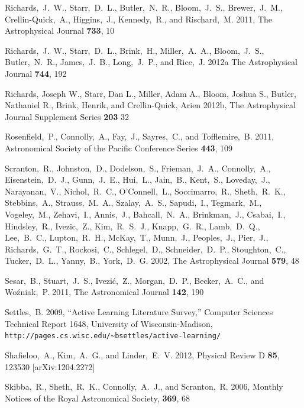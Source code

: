\documentclass[useAMS,usenatbib,tightenlines,11pt,preprint]{aastex}
\begin{document}
\begin{thebibliography}{99}
Richards,~J.~W., Starr,~D.~L., Butler,~N.~R., Bloom,~J.~S., Brewer,~J.~M.,
Crellin-Quick,~A., Higgins,~J., Kennedy,~R., and Rischard,~M. 2011,
The Astrophysical Journal {\bf 733}, 10

Richards,~J.~W., Starr,~D.~L., Brink,~H., Miller,~A.~A., Bloom,~J.~S.,
Butler,~N.~R., James,~J.~B., Long,~J.~P., and Rice,~J. 2012a
The Astrophysical Journal {\bf 744}, 192

Richards, Joseph W., Starr, Dan L., Miller, Adam A., Bloom, Joshua S.,
Butler, Nathaniel R., Brink, Henrik, and Crellin-Quick, Arien 2012b,
The Astrophysical Journal Supplement Series {\bf 203} 32

Rosenfield,~P., Connolly,~A., Fay,~J., Sayres,~C., and Tofflemire,~B. 2011,
Astronomical Society of the Pacific Conference Series {\bf 443}, 109

Scranton,~R., Johnston,~D., Dodelson,~S., Frieman,~J.~A., Connolly,~A.,
Eisenstein,~D.~J., Gunn,~J.~E., Hui,~L., Jain,~B., Kent,~S., Loveday,~J.,
Narayanan,~V., Nichol,~R.~C., O'Connell,~L., Soccimarro,~R., Sheth,~R.~K.,
Stebbins,~A., Strauss,~M.~A., Szalay,~A.~S., Sapudi,~I., Tegmark,~M.,
Vogeley,~M., Zehavi,~I., Annis,~J., Bahcall,~N.~A., Brinkman,~J., Csabai,~I.,
Hindsley,~R., Ivezic,~Z., Kim,~R.~S.~J., Knapp,~G.~R., Lamb,~D.~Q., Lee,~B.~C.,
Lupton,~R.~H., McKay,~T., Munn,~J., Peoples,~J., Pier,~J., Richards,~G.~T.,
Rockosi,~C., Schlegel,~D., Schneider,~D.~P., Stoughton,~C., Tucker,~D.~L.,
Yanny,~B., York,~D.~G. 2002, The Astrophysical Journal {\bf 579}, 48

Sesar,~B., Stuart,~J.~S., Ivezi\'c,~\u Z., Morgan,~D.~P., Becker,~A.~C., and
Wo\'zniak,~P. 2011, The Astronomical Journal {\bf 142}, 190

Settles,~B. 2009, ``Active Learning Literature Survey,'' Computer Sciences Technical
Report 1648, University of Wisconsin-Madison,
\verb|http://pages.cs.wisc.edu/~bsettles/active-learning/|


Shafieloo,~A., Kim,~A.~G., and Linder,~E.~V. 2012,
Physical Review D {\bf 85}, 123530 [arXiv:1204.2272]


Skibba,~R., Sheth,~R.~K., Connolly,~A.~J., and Scranton,~R. 2006,
Monthly Notices of the Royal Astronomical Society, {\bf 369}, 68


\end{thebibliography}
\end{document}
